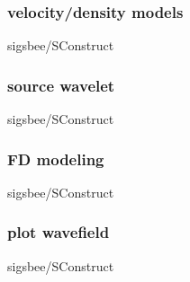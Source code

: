 \begin{frame} \frametitle{velocity/density models}
\normalsize 

		{sigsbee/SConstruct}
\end{frame}
\cwpnote{}
\begin{frame}  \end{frame} \cwpnote{}

\begin{frame} \frametitle{source wavelet}
\normalsize 

		{sigsbee/SConstruct}
\end{frame}
\cwpnote{}
\begin{frame}  \end{frame} \cwpnote{}

\begin{frame} \frametitle{FD modeling}
\normalsize 

		{sigsbee/SConstruct}
\end{frame}
\cwpnote{}

\begin{frame} \frametitle{plot wavefield}
\normalsize 

		{sigsbee/SConstruct}
\end{frame}
\cwpnote{}
\begin{frame}  \end{frame} \cwpnote{}
\begin{frame}  \end{frame} \cwpnote{}
\begin{frame}  \end{frame} \cwpnote{}
\begin{frame}  \end{frame} \cwpnote{}
\begin{frame}  \end{frame} \cwpnote{}
\begin{frame}  \end{frame} \cwpnote{}
\begin{frame}  \end{frame} \cwpnote{}

